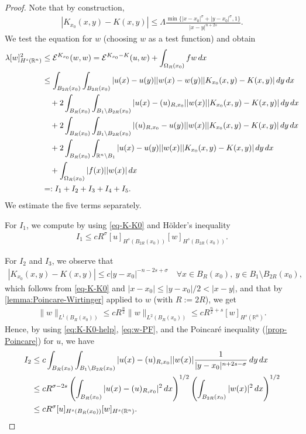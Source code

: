\documentclass[11pt,reqno]{amsart}
\theoremstyle{plain}
\theoremstyle{definition}
\numberwithin{equation}{section}
\newcommand{\R}{\mathbb{R}}
\newcommand{\cE}{\mathcal{E}}
\newcommand{\1}{\mathbbm{1}}
\renewcommand{\d}{\textnormal{\,d}}
\begin{document}
\begin{proof}
Note that by construction,
\begin{align}\label{eq-K-K0}
|K_{x_0}(x,y) - K(x,y)| \le 
    \Lambda \frac{\min\{ |x-x_0|^{\sigma} + |y-x_0|^{\sigma} , 1 \}}{|x-y|^{n+2s}}.
\end{align}
We test the equation for $w$ (choosing $w$ as a test function) and obtain
\begin{align*}
\lambda [w]_{H^s(\R^n)}^2 &\le \cE^{K_{x_0}}(w,w) = \cE^{K_{x_0} - K}(u,w) + \int_{\Omega_R(x_0)} fw \d x\\
&\le \int_{B_{2R}(x_0)}\int_{B_{2R}(x_0)} |u(x) - u(y)||w(x) - w(y)||K_{x_0}(x,y) - K(x,y)| \d y \d x \\
&\quad + 2\int_{B_{R}(x_0)}\int_{B_1 \setminus B_{2R}(x_0)} |u(x) - (u)_{R,x_0}||w(x)||K_{x_0}(x,y) - K(x,y)| \d y \d x \\
&\quad + 2\int_{B_{R}(x_0)} \int_{B_1 \setminus B_{2R}(x_0)} |(u)_{R,x_0} - u(y)||w(x)||K_{x_0}(x,y) - K(x,y)| \d y \d x \\
&\quad + 2\int_{B_{R}(x_0)}\int_{\R^n \setminus B_1} |u(x) - u(y)||w(x)||K_{x_0}(x,y) - K(x,y)| \d y \d x \\
& \quad + \int_{\Omega_R(x_0)} |f(x)||w(x)| \d x\\
&=: I_1 + I_2 + I_3 + I_4 + I_5.
\end{align*}
We estimate the five terms separately.

For $I_1$, we compute by using \eqref{eq-K-K0} and H\"older's inequality
\begin{align*}
I_1 \le c R^{\sigma} [u]_{H^s(B_{2R}(x_0))} [w]_{H^s(B_{2R}(x_0))}.
\end{align*}

For $I_2$ and $I_3$, we observe that
\begin{align}
\label{eq:K-K0-help}
    |K_{x_0}(x,y) - K(x,y)| \le c |y - x_0|^{-n-2s+\sigma} \quad \forall x \in B_R(x_0), ~ y \in B_1 \setminus B_{2R}(x_0),
\end{align}
which follows from \eqref{eq-K-K0} and $|x-x_0| \leq |y-x_0|/2 < |x-y|$, and that by \autoref{lemma:Poincare-Wirtinger} applied to $w$ (with $R:= 2R$), we get
\begin{align}
\label{eq:w-PF}
     \|w\|_{L^1(B_R(x_0))} \le c R^{\frac{n}{2}} \|w\|_{L^2(B_R(x_0))} \le c R^{\frac{n}{2} + s } [w]_{H^s(\R^n)}.
\end{align}
Hence, by using \eqref{eq:K-K0-help}, \eqref{eq:w-PF}, and the Poincar\'e inequality (\autoref{prop-Poincare}) for $u$, we have
\begin{align*}
I_2 &\leq c \int_{B_{R}(x_0)}\int_{B_1 \setminus B_{2R}(x_0)} |u(x) - (u)_{R,x_0}||w(x)| \frac{1}{|y-x_0|^{n+2s-\sigma}} \d y \d x \\
&\leq c R^{\sigma-2s} \left(\int_{B_R(x_0)} |u(x) - (u)_{R,x_0}|^2 \d x \right)^{1/2} \left(\int_{B_{2R}(x_0)} |w(x)|^2 \d x \right)^{1/2} \\
&\leq c R^{\sigma} [u]_{H^s(B_R(x_0))} [w]_{H^s(\R^n)}.
\end{align*}


\end{proof}
\end{document}
